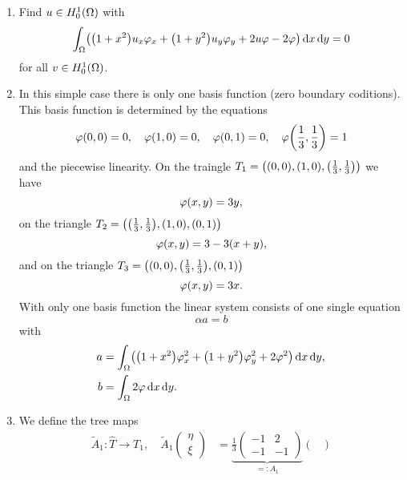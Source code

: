 \documentclass[english]{exercise}
\begin{document}
    \begin{enumerate}
        \item Find \(u \in H_0^1\parentheses*{\Omega}\) with
        \[
            \int_\Omega \parentheses*{\parentheses*{1 + x^2}u_x \varphi_x + \parentheses*{1 + y^2}u_y \varphi_y + 2u\varphi - 2\varphi}\d x\d y = 0
        \]
        for all \(v \in H_0^1\parentheses*{\Omega}\).
        \item In this simple case there is only one basis function (zero boundary coditions).
        This basis function is determined by the equations
        \[
        \varphi\parentheses*{0, 0} = 0, \quad \varphi\parentheses*{1, 0} = 0, \quad \varphi\parentheses*{0, 1} = 0, \quad \varphi\parentheses*{\frac{1}{3}, \frac{1}{3}} = 1
        \]
        and the piecewise linearity.
        On the traingle \(T_1 = \parentheses*{\parentheses*{0, 0}, \parentheses*{1, 0}, \parentheses*{\frac{1}{3}, \frac{1}{3}}}\) we have
        \[
            \varphi\parentheses*{x, y} = 3y,
        \]
        on the triangle \(T_2 = \parentheses*{\parentheses*{\frac{1}{3}, \frac{1}{3}}, \parentheses*{1, 0}, \parentheses*{0, 1}}\)
        \[
            \varphi\parentheses*{x, y} = 3 - 3\parentheses*{x + y},
        \]
        and on the triangle \(T_3 = \parentheses*{\parentheses*{0, 0}, \parentheses*{\frac{1}{3}, \frac{1}{3}}, \parentheses*{0, 1}}\)
        \[
            \varphi\parentheses*{x, y} = 3x.
        \]
        With only one basis function the linear system consists of one single equation
        \[
            \alpha a = b
        \]
        with
        \begin{align}
            a &= \int_\Omega \parentheses*{\parentheses*{1 + x^2}\varphi_x^2 + \parentheses*{1 + y^2}\varphi_y^2 + 2\varphi^2}\d x\d y, \label{eq:2-1}\\
            b &= \int_\Omega 2\varphi\d x\d y.\nonumber
        \end{align}
        \item We define the tree maps
        \begin{align*}
            \tilde{A}_1: \hat{T} \to T_1, \quad \tilde{A}_1\begin{pmatrix}
                \eta\\
                \xi
            \end{pmatrix} &= \underbrace{\frac{1}{3}\begin{pmatrix}
                -1 & 2\\
                -1 & -1
            \end{pmatrix}}_{=: A_1}\begin{pmatrix}

\end{pmatrix}
\end{align*}
\end{enumerate}
\end{document}
